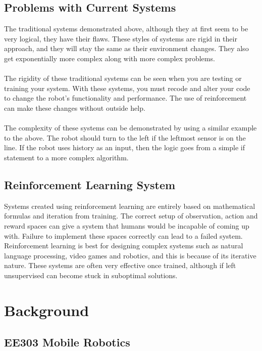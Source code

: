 \documentclass[a4paper,11pt]{article}
\begin{document}
\subsection{Problems with Current Systems}

The traditional systems demonstrated above, although they at first seem to be very logical, they have their flaws. These styles of systems are rigid in their approach, and they will stay the same as their environment changes. They also get exponentially more complex along with more complex problems.
\\\\
The rigidity of these traditional systems can be seen when you are testing or training your system. With these systems, you must recode and alter your code to change the robot's functionality and performance. The use of reinforcement can make these changes without outside help.
\\\\
The complexity of these systems can be demonstrated by using a similar example to the above. The robot should turn to the left if the leftmost sensor is on the line. If the robot uses history as an input, then the logic goes from a simple if statement to a more complex algorithm.


\subsection{Reinforcement Learning System}

Systems created using reinforcement learning are entirely based on mathematical formulas and iteration from training. The correct setup of observation, action and reward spaces can give a system that humans would be incapable of coming up with. Failure to implement these spaces correctly can lead to a failed system. Reinforcement learning is best for designing complex systems such as natural language processing, video games and robotics, and this is because of its iterative nature. These systems are often very effective once trained, although if left unsupervised can become stuck in suboptimal solutions.

\section{Background}
\subsection{EE303 Mobile Robotics}
\end{document}
